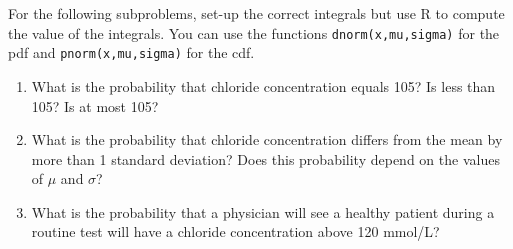 \documentclass[
]{article}
\providecommand{\tightlist}{%
  \setlength{\itemsep}{0pt}\setlength{\parskip}{0pt}}
\begin{document}
\begin{enumerate}
  For the following subproblems, set-up the correct integrals but use R to compute the value of the integrals. You can use the functions \texttt{dnorm(x,mu,sigma)} for the pdf and \texttt{pnorm(x,mu,sigma)} for the cdf.

  \begin{enumerate}
  \def\labelenumii{\alph{enumii}.}
  \tightlist
  \item
    What is the probability that chloride concentration equals 105? Is less than 105? Is at most 105?
  \item
    What is the probability that chloride concentration differs from the mean by more than 1 standard deviation? Does this probability depend on the values of \(\mu\) and \(\sigma\)?
  \item
    What is the probability that a physician will see a healthy patient during a routine test will have a chloride concentration above 120 mmol/L?
  \end{enumerate}
\end{enumerate}
\end{document}
